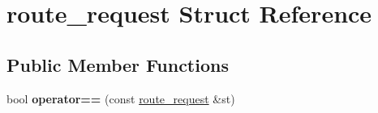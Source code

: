 \hypertarget{structroute__request}{\section{route\-\_\-request Struct Reference}
\label{structroute__request}
}
\subsection*{Public Member Functions}
\begin{DoxyCompactItemize}
\item 
\hypertarget{structroute__request_af3c0e7ba67755f6ad56f9e5b425f36c8}{bool {\bfseries operator==} (const \hyperlink{structroute__request}{route\-\_\-request} \&st)}\label{structroute__request_af3c0e7ba67755f6ad56f9e5b425f36c8}

\end{DoxyCompactItemize}
